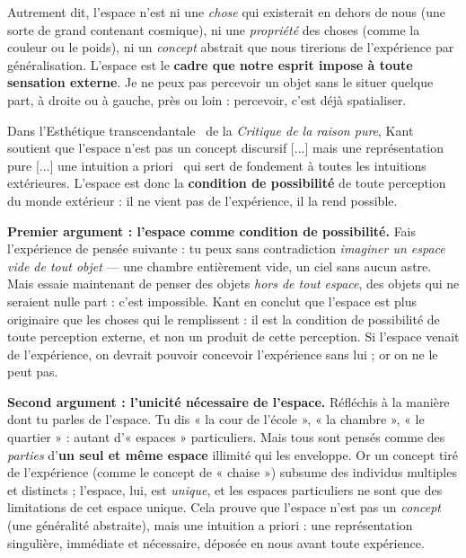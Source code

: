 \documentclass[11pt]{article}
\newcommand{\cle}[1]{{\popxbold\color{popdark}#1}}
\newcounter{popsec}
\newcounter{popsub}
\newcommand{\courssub}[1]{%
  \stepcounter{popsub}%
  \par\vspace{9pt}\noindent{\popxbold\fontsize{11.5}{13}\selectfont\color{popink}{\color{poporange}\thepopsec.\thepopsub}\hspace{6pt}#1}\par\nopagebreak\vspace{4pt}
}
\begin{document}
Autrement dit, l'espace n'est ni une \emph{chose} qui existerait en dehors de nous (une sorte de grand contenant cosmique), ni une \emph{propriété} des choses (comme la couleur ou le poids), ni un \emph{concept} abstrait que nous tirerions de l'expérience par généralisation. L'espace est le \textbf{cadre que notre esprit impose à toute sensation externe}. Je ne peux pas percevoir un objet sans le situer quelque part, à droite ou à gauche, près ou loin : percevoir, c'est déjà spatialiser.

\begin{propriete}
Dans l'\guillemotleft Esthétique transcendantale \guillemotright\ de la \emph{Critique de la raison pure}, Kant soutient que \guillemotleft l'espace n'est pas un concept discursif [...] mais une représentation pure [...] une intuition a priori \guillemotright\ qui sert de fondement à toutes les intuitions extérieures. L'espace est donc la \textbf{condition de possibilité} de toute perception du monde extérieur : il ne vient pas de l'expérience, il la rend possible.
\end{propriete}

\courssub{Les deux grands arguments de Kant}

\textbf{Premier argument : l'espace comme condition de possibilité.} Fais l'expérience de pensée suivante : tu peux sans contradiction \emph{imaginer un espace vide de tout objet} — une chambre entièrement vide, un ciel sans aucun astre. Mais essaie maintenant de penser des objets \emph{hors de tout espace}, des objets qui ne seraient nulle part : c'est impossible. Kant en conclut que l'espace est plus originaire que les choses qui le remplissent : il est la \cle{condition de possibilité} de toute perception externe, et non un produit de cette perception. Si l'espace venait de l'expérience, on devrait pouvoir concevoir l'expérience sans lui ; or on ne le peut pas.

\textbf{Second argument : l'unicité nécessaire de l'espace.} Réfléchis à la manière dont tu parles de l'espace. Tu dis « la cour de l'école », « la chambre », « le quartier » : autant d'« espaces » particuliers. Mais tous sont pensés comme des \emph{parties} d'\textbf{un seul et même espace} illimité qui les enveloppe. Or un concept tiré de l'expérience (comme le concept de « chaise ») subsume des individus multiples et distincts ; l'espace, lui, est \emph{unique}, et les espaces particuliers ne sont que des limitations de cet espace unique. Cela prouve que l'espace n'est pas un \emph{concept} (une généralité abstraite), mais une \cle{intuition a priori} : une représentation singulière, immédiate et nécessaire, déposée en nous avant toute expérience.
\end{document}

